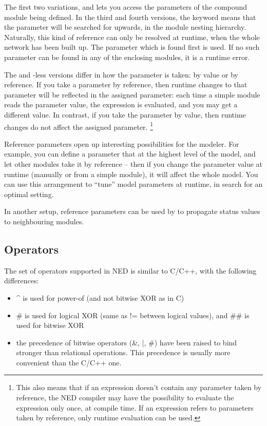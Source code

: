 The first two variations,  and 
lets you access the parameters of the compound module being
defined. In the third and fourth versions, the keyword
 means that the parameter will be searched for upwards,
in the module nesting hierarchy. Naturally, this kind of reference can
only be resolved at runtime, when the whole network has been built up.
The parameter which is found first is used. If no such parameter can be
found in any of the enclosing modules, it is a runtime error.

The  and -less versions differ in how the parameter
is taken: by value or by reference. If you take a parameter by reference,
then runtime changes to that parameter will be reflected in the
assigned parameter: each time a simple module reads the parameter
value, the expression is evaluated, and you may get a different value.
In contrast, if you take the parameter by value, then runtime changes
do not affect the assigned parameter.
  \footnote{This also means that if an expression doesn't contain any parameter
  taken by reference, the NED compiler may have the possibility to evaluate
  the expression only once, at compile time. If an expression refers
  to parameters taken by reference, only runtime evaluation can be used.}

Reference parameters open up interesting possibilities for the modeler.
For example, you can define a parameter that at the highest level
of the model, and let other modules take it by reference --
then if you change the parameter value at runtime
(manually or from a simple module), it will affect the whole model.
You can use this arrangement to ``tune'' model parameters at runtime,
in search for an optimal setting.

In another setup, reference parameters can be used by to propagate
status values to neighbouring modules.



\subsection{Operators}

The set of operators supported in NED is similar to C/C++,
with the following differences:

\begin{itemize}
  \item{{\textasciicircum} is used for power-of (and not bitwise XOR as in C)}
  \item{\# is used for logical XOR (same as != between logical values), and
        \#\# is used for bitwise XOR}
  \item{the precedence of bitwise operators (\&, |, \#) have been raised
        to bind stronger than relational operations. This precedence is usually
        more convenient than the C/C++ one.}
\end{itemize}

